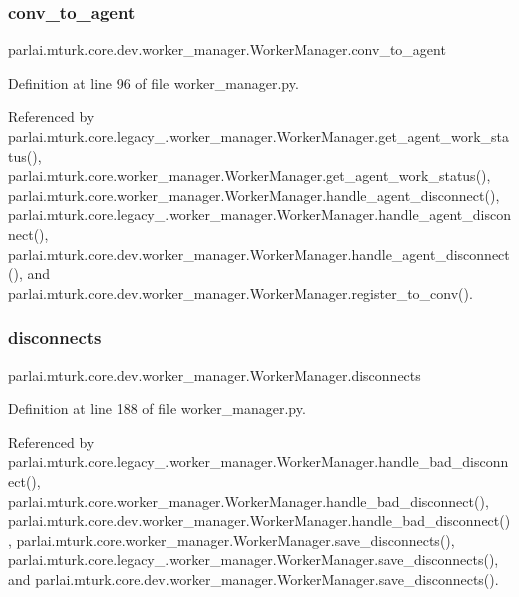 \subsubsection{\texorpdfstring{conv\+\_\+to\+\_\+agent}{conv\_to\_agent}}
{\footnotesize\ttfamily parlai.\+mturk.\+core.\+dev.\+worker\+\_\+manager.\+Worker\+Manager.\+conv\+\_\+to\+\_\+agent}



Definition at line 96 of file worker\+\_\+manager.\+py.



Referenced by parlai.\+mturk.\+core.\+legacy\+\_.\+worker\+\_\+manager.\+Worker\+Manager.\+get\+\_\+agent\+\_\+work\+\_\+status(), parlai.\+mturk.\+core.\+worker\+\_\+manager.\+Worker\+Manager.\+get\+\_\+agent\+\_\+work\+\_\+status(), parlai.\+mturk.\+core.\+worker\+\_\+manager.\+Worker\+Manager.\+handle\+\_\+agent\+\_\+disconnect(), parlai.\+mturk.\+core.\+legacy\+\_.\+worker\+\_\+manager.\+Worker\+Manager.\+handle\+\_\+agent\+\_\+disconnect(), parlai.\+mturk.\+core.\+dev.\+worker\+\_\+manager.\+Worker\+Manager.\+handle\+\_\+agent\+\_\+disconnect(), and parlai.\+mturk.\+core.\+dev.\+worker\+\_\+manager.\+Worker\+Manager.\+register\+\_\+to\+\_\+conv().

\mbox{\label{classparlai_1_1mturk_1_1core_1_1dev_1_1worker__manager_1_1WorkerManager_a7f6d658a79ddc418870fa31d23507070}} 
\subsubsection{\texorpdfstring{disconnects}{disconnects}}
{\footnotesize\ttfamily parlai.\+mturk.\+core.\+dev.\+worker\+\_\+manager.\+Worker\+Manager.\+disconnects}



Definition at line 188 of file worker\+\_\+manager.\+py.



Referenced by parlai.\+mturk.\+core.\+legacy\+\_.\+worker\+\_\+manager.\+Worker\+Manager.\+handle\+\_\+bad\+\_\+disconnect(), parlai.\+mturk.\+core.\+worker\+\_\+manager.\+Worker\+Manager.\+handle\+\_\+bad\+\_\+disconnect(), parlai.\+mturk.\+core.\+dev.\+worker\+\_\+manager.\+Worker\+Manager.\+handle\+\_\+bad\+\_\+disconnect(), parlai.\+mturk.\+core.\+worker\+\_\+manager.\+Worker\+Manager.\+save\+\_\+disconnects(), parlai.\+mturk.\+core.\+legacy\+\_.\+worker\+\_\+manager.\+Worker\+Manager.\+save\+\_\+disconnects(), and parlai.\+mturk.\+core.\+dev.\+worker\+\_\+manager.\+Worker\+Manager.\+save\+\_\+disconnects().

